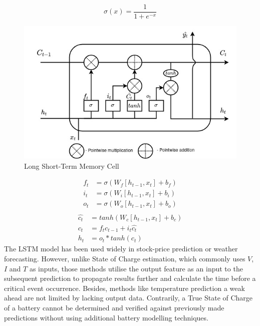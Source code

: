 %
%
\begin{equation}
    \sigma(x) = \frac{1}{1+e^{-x}}
    \label{eq:sigmoid2}
\end{equation}
\begin{figure}[ht]%
    \centering
    \includegraphics[width=0.7\linewidth]{II_Body/LSTM/images/LSTM.jpg}
    \caption{Long Short-Term Memory Cell}
    \label{fig:LSTM-cell2}
\end{figure}
\begin{equation}
    \begin{split}
        f_t &= \sigma \left(W_f \left[h_{t-1}, x_t \right] + b_f \right) \\
        i_t &= \sigma \left(W_i \left[h_{t-1}, x_t \right] + b_i \right) \\
        o_t &= \sigma \left(W_o \left[h_{t-1}, x_t \right] + b_o \right) \\    
    \end{split}
    \label{eq:LSTM-gates2}
\end{equation}
\begin{equation}
    \begin{split}
        \hat{c_t} &= tanh \left(W_c \left[h_{t-1}, x_t \right] + b_c \right) \\
              c_t &= f_t c_{t-1}+i_t \hat{c_t} \\
              h_t &= o_t*tanh \left(c_t \right)
    \end{split}
    \label{eq:LSTM-output2}
\end{equation}
The LSTM model has been used widely in stock-price prediction or weather forecasting.
However, unlike State of Charge estimation, which commonly uses $V$, $I$ and $T$ as inputs, those methods utilise the output feature as an input to the subsequent prediction to propagate results further and calculate the time before a critical event occurrence.
Besides, methods like temperature prediction a weak ahead are not limited by lacking output data.
Contrarily, a True State of Charge of a battery cannot be determined and verified against previously made predictions without using additional battery modelling techniques.

